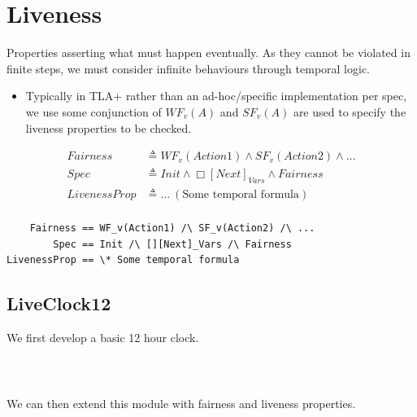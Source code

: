 \section{Liveness}
Properties asserting what must happen eventually. As they cannot be violated in finite steps, we must consider infinite behaviours through temporal logic.
\begin{itemize}
    \item Typically in TLA+ rather than an ad-hoc/specific implementation per spec, we use some conjunction of $WF_v(A)$ and $SF_v(A)$ are used to specify the liveness properties to be checked.
\end{itemize}
\begin{minipage}{.49\textwidth}
    \[\begin{split}
        Fairness & \triangleq WF_v(Action1) \land SF_v(Action2) \land \dots \\
        Spec & \triangleq Init \land \Box[Next]_{Vars} \land Fairness \\
        LivenessProp & \triangleq \dots \ (\text{Some temporal formula}) \\
    \end{split}\]
\end{minipage} \hfill \begin{minipage}{.49\textwidth}
    \begin{verbatim}
    Fairness == WF_v(Action1) /\ SF_v(Action2) /\ ...
        Spec == Init /\ [][Next]_Vars /\ Fairness
LivenessProp == \* Some temporal formula
    \end{verbatim}
\end{minipage}

\subsection{LiveClock12}
We first develop a basic 12 hour clock.
\\ \begin{minipage}{.35\textwidth}
    
\end{minipage} \hfill \begin{minipage}{.32\textwidth}
\inputminted{text}{linear_time_logic/code/Clock12.tla}
\end{minipage} \hfill \begin{minipage}{.22\textwidth}
\inputminted{text}{linear_time_logic/code/Clock12.cfg}
\end{minipage}
\vspace{.3cm}
\\ We can then extend this module with fairness and liveness properties.
\vspace{.3cm}
\\ \begin{minipage}{.48\textwidth}
    
\end{minipage} \hfill \begin{minipage}{.48\textwidth}
\inputminted{text}{linear_time_logic/code/LiveClock12.tla}
\end{minipage}
\vspace{.3cm}
\inputminted{text}{linear_time_logic/code/LiveClock12.cfg} 
